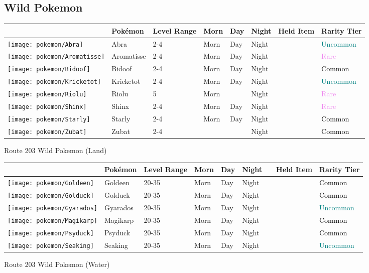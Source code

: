 \subsection{Wild Pokemon}%
\label{subsec:WildPokemon}%
\begin{longtable}{||l l l l l l l l||}%
\hline%
&Pokémon&Level Range&Morn&Day&Night&Held Item&Rarity Tier\\%
\hline%
\endhead%
\hline%
\texttt{[image: pokemon/Abra]}&Abra&2{-}4&Morn&Day&Night&&\textcolor{teal}{%
Uncommon%
}\\%
\hline%
\texttt{[image: pokemon/Aromatisse]}&Aromatisse&2{-}4&Morn&Day&Night&&\textcolor{violet}{%
Rare%
}\\%
\hline%
\texttt{[image: pokemon/Bidoof]}&Bidoof&2{-}4&Morn&Day&Night&&\textcolor{black}{%
Common%
}\\%
\hline%
\texttt{[image: pokemon/Kricketot]}&Kricketot&2{-}4&Morn&Day&Night&&\textcolor{teal}{%
Uncommon%
}\\%
\hline%
\texttt{[image: pokemon/Riolu]}&Riolu&5&Morn&&Night&&\textcolor{violet}{%
Rare%
}\\%
\hline%
\texttt{[image: pokemon/Shinx]}&Shinx&2{-}4&Morn&Day&Night&&\textcolor{violet}{%
Rare%
}\\%
\hline%
\texttt{[image: pokemon/Starly]}&Starly&2{-}4&Morn&Day&Night&&\textcolor{black}{%
Common%
}\\%
\hline%
\texttt{[image: pokemon/Zubat]}&Zubat&2{-}4&&&Night&&\textcolor{black}{%
Common%
}\\%
\hline%
\end{longtable}%
\caption{Route 203 Wild Pokemon (Land)}%
\begin{longtable}{||l l l l l l l l l||}%
\hline%
&Pokémon&Level Range&Morn&Day&Night&&Held Item&Rarity Tier\\%
\hline%
\endhead%
\hline%
\texttt{[image: pokemon/Goldeen]}&Goldeen&20{-}35&Morn&Day&Night&&&\textcolor{black}{%
Common%
}\\%
\hline%
\texttt{[image: pokemon/Golduck]}&Golduck&20{-}35&Morn&Day&Night&&&\textcolor{black}{%
Common%
}\\%
\hline%
\texttt{[image: pokemon/Gyarados]}&Gyarados&20{-}35&Morn&Day&Night&&&\textcolor{teal}{%
Uncommon%
}\\%
\hline%
\texttt{[image: pokemon/Magikarp]}&Magikarp&20{-}35&Morn&Day&Night&&&\textcolor{black}{%
Common%
}\\%
\hline%
\texttt{[image: pokemon/Psyduck]}&Psyduck&20{-}35&Morn&Day&Night&&&\textcolor{black}{%
Common%
}\\%
\hline%
\texttt{[image: pokemon/Seaking]}&Seaking&20{-}35&Morn&Day&Night&&&\textcolor{teal}{%
Uncommon%
}\\%
\hline%
\end{longtable}%
\caption{Route 203 Wild Pokemon (Water)}